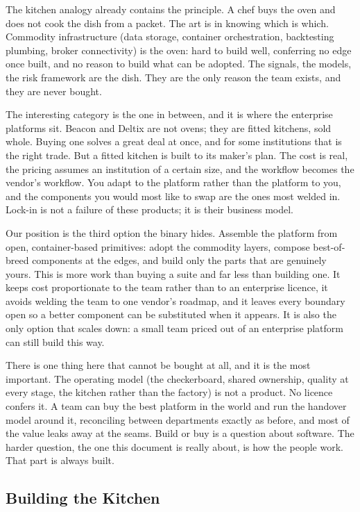 \documentclass[
  11pt,
]{article}
\begin{document}
The kitchen analogy already contains the principle. A chef buys the oven
and does not cook the dish from a packet. The art is in knowing which is
which. Commodity infrastructure (data storage, container orchestration,
backtesting plumbing, broker connectivity) is the oven: hard to build
well, conferring no edge once built, and no reason to build what can be
adopted. The signals, the models, the risk framework are the dish. They
are the only reason the team exists, and they are never bought.

The interesting category is the one in between, and it is where the
enterprise platforms sit. Beacon and Deltix are not ovens; they are
fitted kitchens, sold whole. Buying one solves a great deal at once, and
for some institutions that is the right trade. But a fitted kitchen is
built to its maker's plan. The cost is real, the pricing assumes an
institution of a certain size, and the workflow becomes the vendor's
workflow. You adapt to the platform rather than the platform to you, and
the components you would most like to swap are the ones most welded in.
Lock-in is not a failure of these products; it is their business model.

Our position is the third option the binary hides. Assemble the platform
from open, container-based primitives: adopt the commodity layers,
compose best-of-breed components at the edges, and build only the parts
that are genuinely yours. This is more work than buying a suite and far
less than building one. It keeps cost proportionate to the team rather
than to an enterprise licence, it avoids welding the team to one
vendor's roadmap, and it leaves every boundary open so a better
component can be substituted when it appears. It is also the only option
that scales down: a small team priced out of an enterprise platform can
still build this way.

There is one thing here that cannot be bought at all, and it is the most
important. The operating model (the checkerboard, shared ownership,
quality at every stage, the kitchen rather than the factory) is not a
product. No licence confers it. A team can buy the best platform in the
world and run the handover model around it, reconciling between
departments exactly as before, and most of the value leaks away at the
seams. Build or buy is a question about software. The harder question,
the one this document is really about, is how the people work. That part
is always built.

\subsection{Building the Kitchen}\label{building-the-kitchen}
\end{document}
